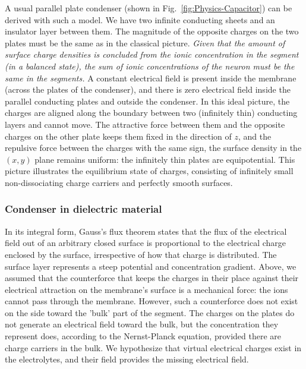 A usual parallel plate condenser (shown in Fig.~\ref{fig:Physics-Capacitor}) can be derived with such a model.
We have two infinite conducting sheets and 
an insulator layer between them. The magnitude of the opposite charges on the two plates must be the same as in the classical picture.
\textit{Given that the amount of surface charge densities is concluded from the ionic concentration in the segment (in a balanced state), the 
	sum of ionic concentrations of the neuron must be the same in the segments.}
A constant electrical field is present inside the membrane (across the plates of the condenser), and there is zero electrical field inside the parallel conducting plates and outside the condenser.
In this ideal picture, the charges are aligned along the boundary between two (infinitely thin) conducting layers and cannot move.
The attractive force between them and the opposite charges on the other plate 
keeps them fixed in the direction of $z$, and the repulsive force
between the charges with the same sign, the surface density in the $(x,y)$ plane remains uniform: the infinitely thin plates are equipotential.
This picture illustrates the equilibrium state of charges, consisting of infinitely small non-dissociating charge carriers and perfectly smooth surfaces. 
\else

\fi

\ifx\magyar\undefined

\subsubsection{Condenser in dielectric material\label{sec:Physics-CondenserEffect}}

In its integral form, %
{Gauss's flux theorem} states that the flux of the electrical field out of an arbitrary closed surface is proportional to the electrical charge enclosed by the surface, irrespective of how that charge is distributed.
The surface layer represents a steep potential and concentration gradient.
Above, we assumed that the counterforce that keeps the charges in their place
against their electrical attraction on the membrane's surface is a mechanical force: the ions cannot pass through the membrane.
However, such a counterforce does not exist on the side toward the 'bulk' part of the segment. 
The charges on the plates do not generate an electrical field
toward the bulk, but the concentration they represent does, according to the Nernst-Planck equation, provided there are charge carriers in the bulk. 
We hypothesize that virtual 
electrical charges exist in the electrolytes, and their field provides the missing electrical field.

